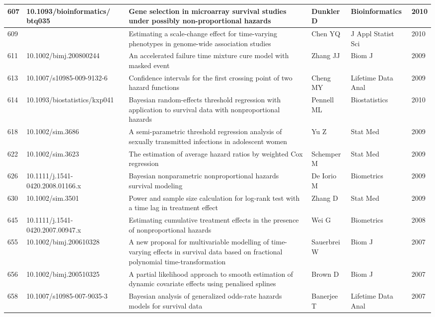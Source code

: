 \begin{landscape}
\begin{longtable}{|p{0.3in}|p{1.8in}|p{2.4in}|p{0.68in}|p{0.89in}|p{0.3in}|}
607 & 10.1093/bioinformatics/   \-btq035 & Gene selection in microarray survival studies under possibly non-proportional hazards & Dunkler D & Bioinformatics & 2010 \\ \hline 
609 &  & Estimating a scale-change effect for time-varying phenotypes in genome-wide association studies & Chen YQ & J Appl Statist Sci & 2010 \\ \hline 
611 & 10.1002/bimj.200800244    & An accelerated failure time mixture cure model with masked event & Zhang JJ & Biom J & 2009 \\ \hline 
613 & 10.1007/s10985-009-9132-6     & Confidence intervals for the first crossing point of two hazard functions & Cheng MY & Lifetime Data Anal & 2009 \\ \hline 
614 & 10.1093/biostatistics/kxp041    & Bayesian random-effects threshold regression with application to survival data with nonproportional hazards & Pennell ML & Biostatistics & 2010 \\ \hline 
618 & 10.1002/sim.3686     & A semi-parametric threshold regression analysis of sexually transmitted infections in adolescent women & Yu Z & Stat Med & 2009 \\ \hline 
622 & 10.1002/sim.3623     & The estimation of average hazard ratios by weighted Cox regression & Schemper M & Stat Med & 2009 \\ \hline 
626 & 10.1111/j.1541-0420.2008.01166.x     & Bayesian nonparametric nonproportional hazards survival modeling & De Iorio M & Biometrics & 2009 \\ \hline 
630 & 10.1002/sim.3501     & Power and sample size calculation for log-rank test with a time lag in treatment effect & Zhang D & Stat Med & 2009 \\ \hline 
645 & 10.1111/j.1541-0420.2007.00947.x     & Estimating cumulative treatment effects in the presence of nonproportional hazards & Wei G & Biometrics & 2008 \\ \hline 
655 & 10.1002/bimj.200610328    & A new proposal for multivariable modelling of time-varying effects in survival data based on fractional polynomial time-transformation & Sauerbrei W & Biom J & 2007 \\ \hline 
656 & 10.1002/bimj.200510325    & A partial likelihood approach to smooth estimation of dynamic covariate effects using penalised splines & Brown D & Biom J & 2007 \\ \hline 
658 & 10.1007/s10985-007-9035-3     & Bayesian analysis of generalized odds-rate hazards models for survival data & Banerjee T & Lifetime Data Anal & 2007 \\ \hline 

\end{longtable}
\end{landscape}
